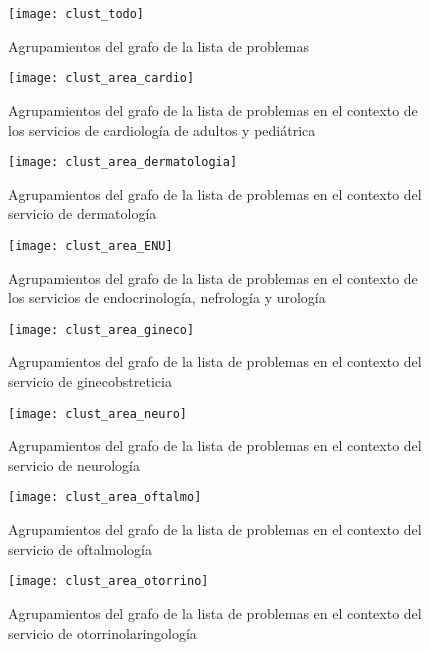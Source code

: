 \begin{figure}[ht]
\caption{Agrupamientos del grafo de la lista de problemas}
\label{fig:clust_todo}
\centering
\texttt{[image: clust\_todo]}
\end{figure}

\begin{figure}[ht]
\caption{Agrupamientos del grafo de la lista de problemas en el contexto de los servicios de cardiología de adultos y pediátrica}
\label{fig:clust_area_cardio}
\centering
\texttt{[image: clust\_area\_cardio]}
\end{figure}

\begin{figure}[ht]
\caption{Agrupamientos del grafo de la lista de problemas en el contexto del servicio de dermatología}
\label{fig:clust_area_dermatologia}
\centering
\texttt{[image: clust\_area\_dermatologia]}
\end{figure}

\begin{figure}[ht]
\caption{Agrupamientos del grafo de la lista de problemas en el contexto de los servicios de endocrinología, nefrología y urología}
\label{fig:clust_area_ENU}
\centering
\texttt{[image: clust\_area\_ENU]}
\end{figure}

\begin{figure}[ht]
\caption{Agrupamientos del grafo de la lista de problemas en el contexto del servicio de ginecobstreticia }
\label{fig:clust_area_gineco}
\centering
\texttt{[image: clust\_area\_gineco]}
\end{figure}

\begin{figure}[ht]
\caption{Agrupamientos del grafo de la lista de problemas en el contexto del servicio de neurología }
\label{fig:clust_area_neuro}
\centering
\texttt{[image: clust\_area\_neuro]}
\end{figure}

\begin{figure}[ht]
\caption{Agrupamientos del grafo de la lista de problemas en el contexto del servicio de oftalmología }
\label{fig:clust_area_oftalmo}
\centering
\texttt{[image: clust\_area\_oftalmo]}
\end{figure}

\begin{figure}[ht]
\caption{Agrupamientos del grafo de la lista de problemas en el contexto del servicio de otorrinolaringología }
\label{fig:clust_area_otorrino}
\centering
\texttt{[image: clust\_area\_otorrino]}
\end{figure}

